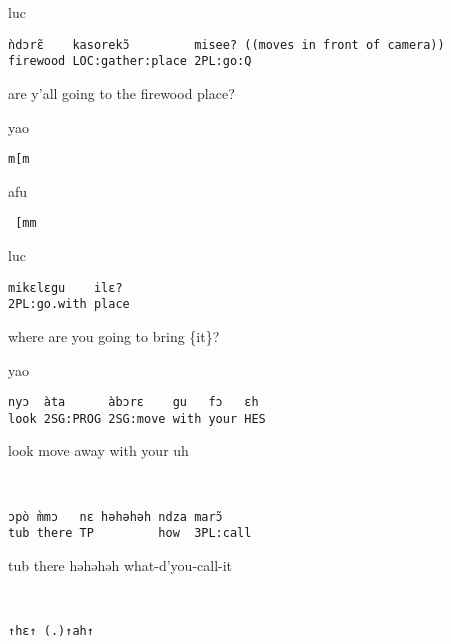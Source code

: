 \documentclass[output=paper]{langsci/langscibook}
\begin{document}
\newpage
{}\vspace{2mm}
%
\begin{transbox}{1}{luc}
\begin{verbatim}
ǹdɔrɛ̃    kasorekɔ̃         misee? ((moves in front of camera))
firewood LOC:gather:place 2PL:go:Q
\end{verbatim}
are y’all going to the firewood place?
\end{transbox}
%
\begin{transbox}{2}{yao}
\begin{verbatim}
m[m
\end{verbatim}
\end{transbox}
%
\begin{transbox}{3}{afu}
\begin{verbatim}
 [mm
\end{verbatim}
\end{transbox}
%
\begin{transbox}{4}{luc}
\begin{verbatim}
mikɛlɛgu    ilɛ?
2PL:go.with place
\end{verbatim}
where are you going to bring \{it\}?
\end{transbox}
%
\begin{mdframednoverticalspace}[style=firstfoc]
\begin{transbox}{5}{yao}
\begin{verbatim}
nyɔ  àta      àbɔrɛ    gu   fɔ   ɛh
look 2SG:PROG 2SG:move with your HES
\end{verbatim}
look move away with your uh
\end{transbox}
\end{mdframednoverticalspace}
%
\begin{mdframednoverticalspace}[style=firstfoc]
\begin{transbox}{6}{~}
\begin{verbatim}
ɔpò m̀mɔ   nɛ həhəhəh ndza marɔ̃ 
tub there TP         how  3PL:call
\end{verbatim}
tub there həhəhəh what-d’you-call-it
\end{transbox}
\end{mdframednoverticalspace}
%
\begin{mdframednoverticalspace}[style=secondfoc]
\end{mdframednoverticalspace}\vspace{-2mm}
%
\begin{transbox}{8}{~}
\begin{verbatim}
↑hɛ↑ (.)↑ah↑
\end{verbatim}
\end{transbox}\\
\end{document}

